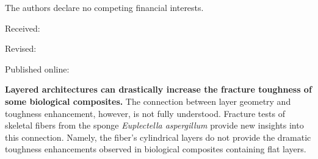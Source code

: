 \documentclass[12pt,onecolumn]{article}
\begin{document}
\begin{bibunit}
The authors declare no competing financial interests.

\vspace{2em}
\tabto{12cm} Received: \hfill

\tabto{12cm} Revised: \hfill

\tabto{12cm} Published online: \hfill



\putbib[refs]
% 

\processdelayedfloats

\end{bibunit}

\makeatletter
\efloat@restorefloats
\makeatother

\singlespacing
\clearpage
\pagebreak
\onecolumn
\nolinenumbers

{\bf Layered architectures can drastically increase the fracture toughness of some biological composites.}
%
The connection between layer geometry and toughness enhancement, however, is not fully understood.
%
Fracture tests of skeletal fibers from the sponge \textit{Euplectella aspergillum} provide new insights into this connection.
%
Namely, the fiber's cylindrical layers do not provide the dramatic toughness enhancements observed in biological composites containing flat layers.
\end{document}
